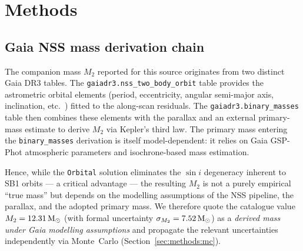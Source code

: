\documentclass[usenatbib,fleqn]{mnras}
\newcommand{\Msun}{{\rm M}_\odot}
\begin{document}
\section{Methods}
\label{sec:methods}

\noindent{}
\medskip

\subsection{Gaia NSS mass derivation chain}
\label{sec:methods:nss}

The companion mass $M_2$ reported for this source originates from
two distinct Gaia DR3 tables.  The \texttt{gaiadr3.nss\_two\_body\_orbit}
table provides the astrometric orbital elements (period, eccentricity,
angular semi-major axis, inclination, etc.\ ) fitted to the along-scan
residuals.  The \texttt{gaiadr3.binary\_masses} table then combines these
elements with the parallax and an external primary-mass estimate to
derive $M_2$ via Kepler's third law.  The primary mass entering the
\texttt{binary\_masses} derivation is itself model-dependent: it relies
on Gaia GSP-Phot atmospheric parameters and isochrone-based mass
estimation.

Hence, while the \texttt{Orbital} solution eliminates the
$\sin i$ degeneracy inherent to SB1 orbits --- a critical
advantage --- the resulting $M_2$ is not a purely empirical
``true mass'' but depends on the modelling assumptions of the NSS
pipeline, the parallax, and the adopted primary mass.  We therefore
quote the catalogue value $M_2 = 12.31\,\Msun$ (with formal
uncertainty $\sigma_{M_2} = 7.52\,\Msun$) as a
\emph{derived mass under Gaia modelling assumptions} and
propagate the relevant uncertainties independently via Monte~Carlo
(Section~\ref{sec:methods:mc}).
\end{document}
